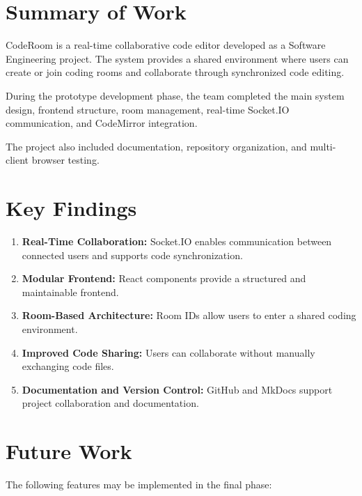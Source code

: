 \documentclass[12pt,a4paper,oneside]{report}
\begin{document}
\section{Summary of Work}

CodeRoom is a real-time collaborative code editor developed as a Software Engineering project. The system provides a shared environment where users can create or join coding rooms and collaborate through synchronized code editing.

During the prototype development phase, the team completed the main system design, frontend structure, room management, real-time Socket.IO communication, and CodeMirror integration.

The project also included documentation, repository organization, and multi-client browser testing.

\section{Key Findings}

\begin{enumerate}
    \item \textbf{Real-Time Collaboration:}
    Socket.IO enables communication between connected users and supports code synchronization.

    \item \textbf{Modular Frontend:}
    React components provide a structured and maintainable frontend.

    \item \textbf{Room-Based Architecture:}
    Room IDs allow users to enter a shared coding environment.

    \item \textbf{Improved Code Sharing:}
    Users can collaborate without manually exchanging code files.

    \item \textbf{Documentation and Version Control:}
    GitHub and MkDocs support project collaboration and documentation.
\end{enumerate}

\section{Future Work}

The following features may be implemented in the final phase:
\end{document}
